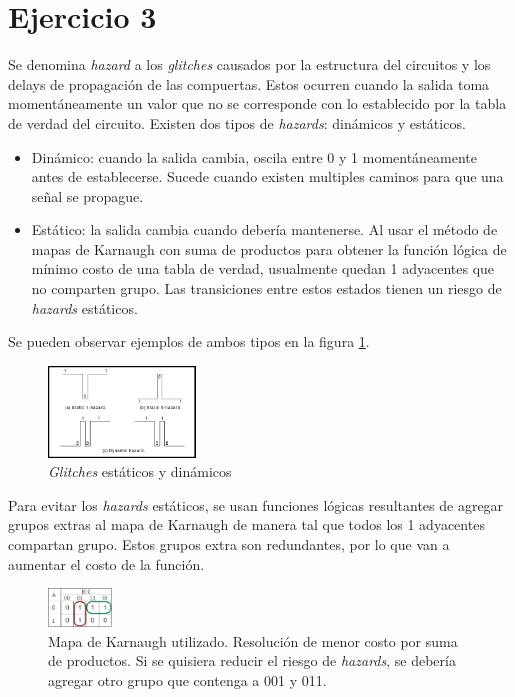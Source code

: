\documentclass[../../e3_tp2_main.tex]{subfiles}
\begin{document}
\section{Ejercicio 3}

Se denomina \textit{hazard} a los \textit{glitches} causados por la estructura del circuitos y los delays de propagaci\'on de las compuertas. Estos ocurren cuando la salida toma moment\'aneamente un valor que no se corresponde con lo establecido por la tabla de verdad del circuito. Existen dos tipos de \textit{hazards}: din\'amicos y est\'aticos.
\begin{itemize}
	\item Din\'amico: cuando la salida cambia, oscila entre 0 y 1 moment\'aneamente antes de establecerse. Sucede cuando existen multiples caminos para que una se\~nal se propague. 
	\item Est\'atico: la salida cambia cuando deber\'ia mantenerse. Al usar el m\'etodo de mapas de Karnaugh con suma de productos para obtener la funci\'on l\'ogica de m\'inimo costo de una tabla de verdad, usualmente quedan 1 adyacentes que no comparten grupo. Las transiciones entre estos estados tienen un riesgo de \textit{hazards} est\'aticos. 
\end{itemize}
Se pueden observar ejemplos de ambos tipos en la figura \ref{fig:ej_3_hazards}.


\begin{figure}[H]	%
	\centering
	\includegraphics[width=0.35\textwidth]{hazard.png}
	\caption{\textit{Glitches} est\'aticos y din\'amicos \protect\footnotemark}
	\label{fig:ej_3_hazards}
\end{figure}



Para evitar los \textit{hazards} est\'aticos, se usan funciones l\'ogicas resultantes de agregar grupos extras al mapa de Karnaugh de manera tal que todos los 1 adyacentes compartan grupo. Estos grupos extra son redundantes, por lo que van a aumentar el costo de la funci\'on.

\begin{figure}[H]	%
	\centering
	\includegraphics[width=0.15\textwidth]{kmap.png}
	\caption{Mapa de Karnaugh utilizado. Resoluci\'on de menor costo por suma de productos. Si se quisiera reducir el riesgo de \textit{hazards}, se deber\'ia agregar otro grupo que contenga a 001 y 011.}
	\label{fig:ej_3_kmap}
\end{figure}
\end{document}
